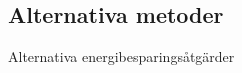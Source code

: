 \subsection{Alternativa metoder}

\begin{frame}{Alternativa energibesparingsåtgärder}
\begin{figure}
\centering
{}

\end{figure}
\end{frame}
